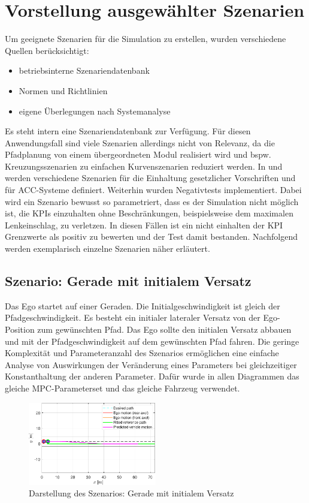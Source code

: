 \chapter{Vorstellung ausgewählter Szenarien} \label{chap:Vorstellung_Szenarien}
\thispagestyle{empty}
Um geeignete Szenarien für die Simulation zu erstellen, wurden verschiedene Quellen berücksichtigt:
\begin{itemize}
    \item betriebsinterne Szenariendatenbank
    \item Normen und Richtlinien 
    \item eigene Überlegungen nach Systemanalyse
\end{itemize}

\noindent Es steht intern eine Szenariendatenbank zur Verfügung. Für diesen Anwendungsfall sind viele Szenarien allerdings nicht von Relevanz, da die Pfadplanung von einem übergeordneten Modul realisiert wird und bspw. Kreuzungsszenarien zu einfachen Kurvenszenarien reduziert werden. In \cite{ISO15622} und \cite{NCAP2024} werden verschiedene Szenarien für die Einhaltung gesetzlicher Vorschriften und für ACC-Systeme definiert. Weiterhin wurden Negativtests implementiert. Dabei wird ein Szenario bewusst so parametriert, dass es der Simulation nicht möglich ist, die KPIs einzuhalten ohne Beschränkungen, beispielsweise dem maximalen Lenkeinschlag, zu verletzen. In diesen Fällen ist ein nicht einhalten der KPI Grenzwerte als positiv zu bewerten und der Test damit bestanden. Nachfolgend werden exemplarisch einzelne Szenarien näher erläutert. 

\section{Szenario: Gerade mit initialem Versatz} \label{sec:straight_offset}
Das Ego startet auf einer Geraden. Die Initialgeschwindigkeit ist gleich der Pfadgeschwindigkeit. Es besteht ein initialer lateraler Versatz von der Ego-Position zum gewünschten Pfad. Das Ego sollte den initialen Versatz abbauen und mit der Pfadgeschwindigkeit auf dem gewünschten Pfad fahren. Die geringe Komplexität und Parameteranzahl des Szenarios ermöglichen eine einfache Analyse von Auswirkungen der Veränderung eines Parameters bei gleichzeitiger Konstanthaltung der anderen Parameter. Dafür wurde in allen Diagrammen das gleiche MPC-Parameterset und das gleiche Fahrzeug verwendet.
\begin{figure}[ht]
    \centering
    \includegraphics[width=0.5\textwidth]{figures/3_Implementierung/Straight_Offset/test_straight_depiction.pdf}
    \caption{Darstellung des Szenarios: Gerade mit initialem Versatz}
    \label{fig:test_straight_depiction}
\end{figure}


